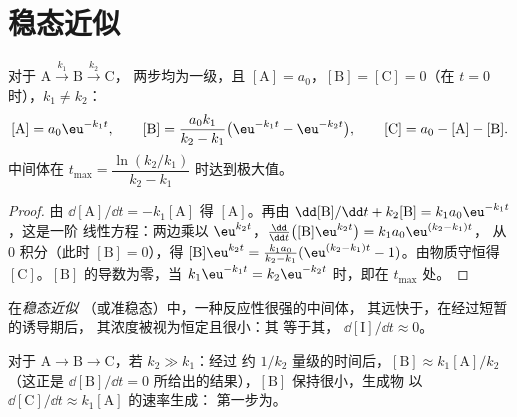 \section{稳态近似}

\begin{theorem}[连续一级反应]\label{thm:b1:elementary-steps:consecutive}
对于 $\mathrm{A} \xrightarrow{k_1} \mathrm{B} \xrightarrow{k_2} \mathrm{C}$，
两步均为一级，且 $[\mathrm{A}] = a_0$，$[\mathrm{B}] =
[\mathrm{C}] = 0$（在 $t = 0$ 时），$k_1 \ne k_2$：
\[
  [\mathrm{A}] = a_0\eu^{-k_1t}, \qquad
  [\mathrm{B}] = \frac{a_0k_1}{k_2 - k_1}\big(\eu^{-k_1t} - \eu^{-k_2t}\big),
  \qquad [\mathrm{C}] = a_0 - [\mathrm{A}] - [\mathrm{B}] .
\]
中间体在 $t_{\max} = \dfrac{\ln(k_2/k_1)}
{k_2 - k_1}$ 时达到极大值。
\end{theorem}

\begin{proof}
由 $\dd[\mathrm{A}]/\dd t = -k_1[\mathrm{A}]$ 得 $[\mathrm{A}]$。再由
$\dd[\mathrm{B}]/\dd t + k_2[\mathrm{B}] = k_1a_0\eu^{-k_1t}$，这是一阶
线性方程：两边乘以 $\eu^{k_2t}$，$\frac{\dd}{\dd t}
\big([\mathrm{B}]\eu^{k_2t}\big) = k_1a_0\eu^{(k_2-k_1)t}$，
从 0 积分（此时 $[\mathrm{B}] = 0$），得 $[\mathrm{B}]\eu^{k_2t} =
\frac{k_1a_0}{k_2-k_1}(\eu^{(k_2-k_1)t} - 1)$。由物质守恒得
$[\mathrm{C}]$。$[\mathrm{B}]$ 的导数为零，当 $k_1\eu^{-k_1t}
= k_2\eu^{-k_2t}$ 时，即在 $t_{\max}$ 处。
\end{proof}

\begin{definition}[稳态近似]\label{def:b1:elementary-steps:qssa}
在\emph{稳态近似}
（或准稳态）中，一种反应性很强的中间体，
其远快于，在经过短暂的诱导期后，
其浓度被视为恒定且很小：其
等于其，
$\dd[\mathrm{I}]/\dd t \approx 0$。
\end{definition}

\begin{proposition}[稳态成立的条件]\label{prop:b1:elementary-steps:qssa-justified}
对于 $\mathrm{A} \to \mathrm{B} \to \mathrm{C}$，若 $k_2 \gg k_1$：经过
约 $1/k_2$ 量级的时间后，$[\mathrm{B}] \approx k_1[\mathrm{A}]/k_2$（这正是
$\dd[\mathrm{B}]/\dd t = 0$ 所给出的结果），$[\mathrm{B}]$ 保持很小，生成物
以 $\dd[\mathrm{C}]/\dd t \approx k_1[\mathrm{A}]$ 的速率生成：
第一步为。
\end{proposition}

